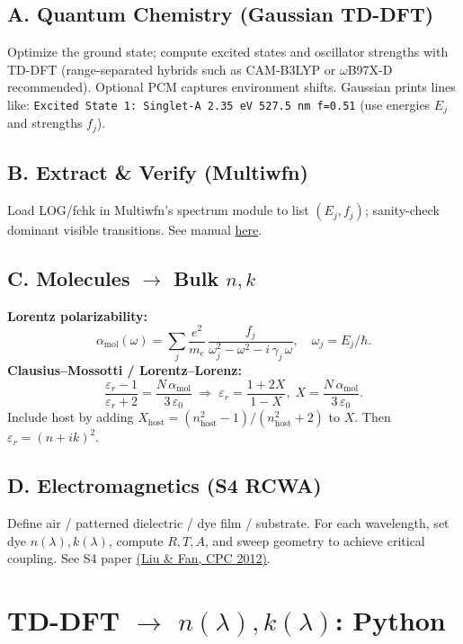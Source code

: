 \documentclass[11pt,a4paper]{article}
\begin{document}
\subsection*{A. Quantum Chemistry (Gaussian TD-DFT)}
Optimize the ground state; compute excited states and oscillator strengths with TD-DFT (range-separated hybrids such as CAM-B3LYP or $\omega$B97X-D recommended). Optional PCM captures environment shifts. Gaussian prints lines like: \texttt{Excited State 1: Singlet-A 2.35 eV 527.5 nm f=0.51} (use energies $E_j$ and strengths $f_j$).

\subsection*{B. Extract \& Verify (Multiwfn)}
Load LOG/fchk in Multiwfn's spectrum module to list $(E_j,f_j)$; sanity-check dominant visible transitions. See manual \href{https://sobereva.com/multiwfn/misc/Multiwfn_3.8_dev.pdf}{here}.

\subsection*{C. Molecules $\to$ Bulk $n,k$}
\textbf{Lorentz polarizability:}
\begin{equation}
\alpha_{\mathrm{mol}}(\omega)=\sum_j \frac{e^2}{m_e}\,\frac{f_j}{\omega_j^2-\omega^2-i\,\gamma_j\,\omega},\quad \omega_j=E_j/\hbar.
\end{equation}
\textbf{Clausius--Mossotti / Lorentz--Lorenz:}
\begin{equation}
\frac{\varepsilon_r-1}{\varepsilon_r+2}=\frac{N\,\alpha_{\mathrm{mol}}}{3\,\varepsilon_0}\;\Rightarrow\; \varepsilon_r=\frac{1+2X}{1-X},\; X=\frac{N\,\alpha_{\mathrm{mol}}}{3\,\varepsilon_0}.
\end{equation}
Include host by adding $X_{\mathrm{host}}=(n_{\mathrm{host}}^2-1)/(n_{\mathrm{host}}^2+2)$ to $X$. Then $\varepsilon_r=(n+ik)^2$.

\subsection*{D. Electromagnetics (S4 RCWA)}
Define air / patterned dielectric / dye film / substrate. For each wavelength, set dye $n(\lambda),k(\lambda)$, compute $R,T,A$, and sweep geometry to achieve critical coupling. See S4 paper \href{https://web.stanford.edu/group/fan/publication/Liu_ComputerPhysicsCommunications_183_2233_2012.pdf}{(Liu \& Fan, CPC 2012)}.

\section{TD-DFT $\to$ $n(\lambda),k(\lambda)$: Python}
\end{document}
